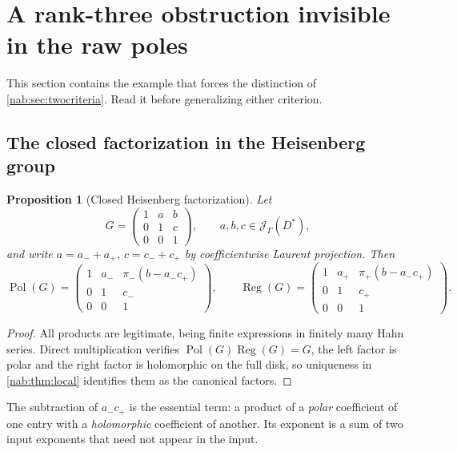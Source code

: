 \documentclass[11pt,letterpaper]{article}
\newtheorem{proposition}[proposition]{Proposition}
\theoremstyle{definition}
\theoremstyle{remark}
\newcommand{\JJ}{\mathscr J_\Gamma}
\newcommand{\Pol}{\operatorname{Pol}}
\newcommand{\Reg}{\operatorname{Reg}}
\numberwithin{equation}{section}
\begin{document}
\section{A rank-three obstruction invisible in the raw poles}
\label{nab:sec:rankthree}

This section contains the example that forces the distinction of
\cref{nab:sec:twocriteria}. Read it before generalizing either criterion.

\subsection{The closed factorization in the Heisenberg group}

\begin{proposition}[Closed Heisenberg factorization]
\label{nab:prop:heisenberg}
Let
\[
 G=\begin{pmatrix}1&a&b\\0&1&c\\0&0&1\end{pmatrix},
 \qquad a,b,c\in\JJ(D^*),
\]
and write $a=a_-+a_+$, $c=c_-+c_+$ by coefficientwise Laurent projection. Then
\begin{equation}\label{nab:eq:HeisenbergP}
 \Pol(G)=
 \begin{pmatrix}
  1&a_-&\pi_-(b-a_-c_+)\\ 0&1&c_-\\ 0&0&1
 \end{pmatrix},
 \qquad
 \Reg(G)=
 \begin{pmatrix}
  1&a_+&\pi_+(b-a_-c_+)\\ 0&1&c_+\\ 0&0&1
 \end{pmatrix}.
\end{equation}
\end{proposition}

\begin{proof}
All products are legitimate, being finite expressions in finitely many Hahn
series. Direct multiplication verifies $\Pol(G)\Reg(G)=G$, the left factor is
polar and the right factor is holomorphic on the full disk, so uniqueness in
\cref{nab:thm:local} identifies them as the canonical factors.
\end{proof}

The subtraction of $a_-c_+$ is the essential term: a product of a \emph{polar}
coefficient of one entry with a \emph{holomorphic} coefficient of another. Its
exponent is a sum of two input exponents that need not appear in the input.
\end{document}
